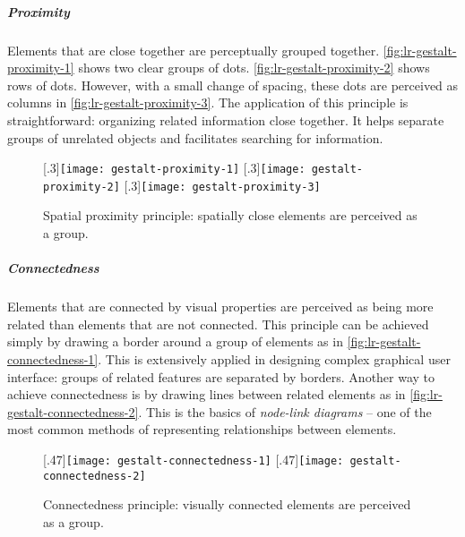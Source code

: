 \subparagraph{Proximity} 
Elements that are close together are perceptually grouped together. \autoref{fig:lr-gestalt-proximity-1} shows two clear groups of dots. \autoref{fig:lr-gestalt-proximity-2} shows rows of dots. However, with a small change of spacing, these dots are perceived as columns in \autoref{fig:lr-gestalt-proximity-3}. The application of this principle is straightforward: organizing related information close together. It helps separate groups of unrelated objects and facilitates searching for information.

\begin{figure}[!htb]
	\centering
	[.3\columnwidth]{\texttt{[image: gestalt-proximity-1]}} 
	\hfill
	[.3\columnwidth]{\texttt{[image: gestalt-proximity-2]}} 
	\hfill
	[.3\columnwidth]{\texttt{[image: gestalt-proximity-3]}}
	\label{fig:lr-gestalt-proximity}
	\caption[Spatial proximity principle]{Spatial proximity principle: spatially close elements are perceived as a group. }
\end{figure}

\subparagraph{Connectedness} 
Elements that are connected by visual properties are perceived as being more related than elements that are not connected. This principle can be achieved simply by drawing a border around a group of elements as in \autoref{fig:lr-gestalt-connectedness-1}. This is extensively applied in designing complex graphical user interface: groups of related features are separated by borders. Another way to achieve connectedness is by drawing lines between related elements as in \autoref{fig:lr-gestalt-connectedness-2}. This is the basics of \emph{node-link diagrams} -- one of the most common methods of representing relationships between elements.

\begin{figure}[!htb]
	\centering
	[.47\columnwidth]{\texttt{[image: gestalt-connectedness-1]}} 
	\hfill
	[.47\columnwidth]{\texttt{[image: gestalt-connectedness-2]}} 
	\caption[Connectedness principle]{Connectedness principle: visually connected elements are perceived as a group. }
	\label{fig:lr-gestalt-connectedness}
\end{figure}

